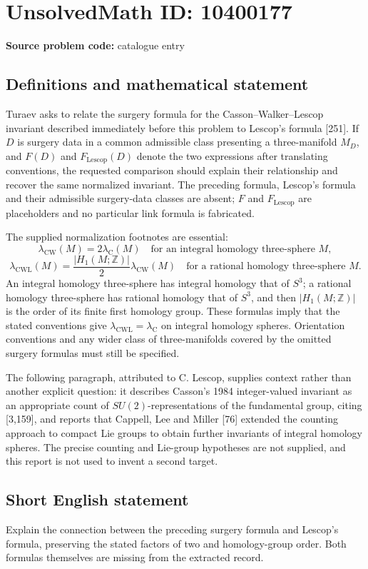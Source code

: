 \documentclass[11pt]{article}
\newcommand{\Z}{\mathbb{Z}}
\begin{document}
\section*{UnsolvedMath ID: 10400177}
\textbf{Source problem code:} catalogue entry
\subsection{Definitions and mathematical statement}
Turaev asks to relate the surgery formula for the Casson--Walker--Lescop invariant described immediately before this problem to Lescop's formula [251]. If \(D\) is surgery data in a common admissible class presenting a three-manifold \(M_D\), and \(F(D)\) and \(F_{\mathrm{Lescop}}(D)\) denote the two expressions after translating conventions, the requested comparison should explain their relationship and recover the same normalized invariant. The preceding formula, Lescop's formula and their admissible surgery-data classes are absent; \(F\) and \(F_{\mathrm{Lescop}}\) are placeholders and no particular link formula is fabricated.

The supplied normalization footnotes are essential:
\[\lambda_{\mathrm{CW}}(M)=2\lambda_{\mathrm C}(M)
\quad\text{for an integral homology three-sphere }M,\]
\[\lambda_{\mathrm{CWL}}(M)=\frac{|H_1(M;\Z)|}{2}\lambda_{\mathrm{CW}}(M)
\quad\text{for a rational homology three-sphere }M.\]
An integral homology three-sphere has integral homology that of \(S^3\); a rational homology three-sphere has rational homology that of \(S^3\), and then \(|H_1(M;\Z)|\) is the order of its finite first homology group. These formulas imply that the stated conventions give \(\lambda_{\mathrm{CWL}}=\lambda_{\mathrm C}\) on integral homology spheres. Orientation conventions and any wider class of three-manifolds covered by the omitted surgery formulas must still be specified.

The following paragraph, attributed to C. Lescop, supplies context rather than another explicit question: it describes Casson's 1984 integer-valued invariant as an appropriate count of \(SU(2)\)-representations of the fundamental group, citing [3,159], and reports that Cappell, Lee and Miller [76] extended the counting approach to compact Lie groups to obtain further invariants of integral homology spheres. The precise counting and Lie-group hypotheses are not supplied, and this report is not used to invent a second target.
\subsection{Short English statement}
Explain the connection between the preceding surgery formula and Lescop's formula, preserving the stated factors of two and homology-group order. Both formulas themselves are missing from the extracted record.
\end{document}
